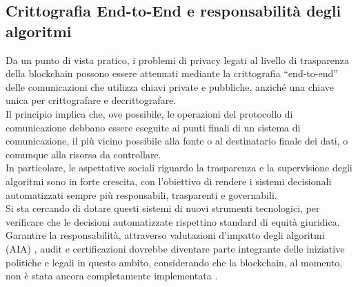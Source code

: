 \subsection{Crittografia End-to-End e responsabilità degli algoritmi}
Da un punto di vista pratico, i problemi di privacy legati al livello di trasparenza della blockchain possono essere attenuati mediante la crittografia “end-to-end” delle comunicazioni che utilizza chiavi private e pubbliche, anziché una chiave unica per crittografare e decrittografare.
\\Il principio implica che, ove possibile, le operazioni del protocollo di comunicazione debbano essere eseguite ai punti finali di un sistema di comunicazione, il più vicino possibile alla fonte o al destinatario finale dei dati, o comunque alla risorsa da controllare.
\\In particolare, le aspettative sociali riguardo la trasparenza e la supervisione degli algoritmi sono in forte crescita, con l’obiettivo di rendere i sistemi decisionali automatizzati sempre più responsabili, trasparenti e governabili. 
\\Si sta cercando di dotare questi sistemi di nuovi strumenti tecnologici, per verificare che le decisioni automatizzate rispettino standard di equità giuridica. 
\\Garantire la responsabilità, attraverso valutazioni d’impatto degli algoritmi (AIA) \cite{reisman_algorithmic_2018}, audit e certificazioni dovrebbe diventare parte integrante delle iniziative politiche e legali in questo ambito, considerando che la blockchain, al momento, non è stata ancora completamente implementata \cite{zhang_end_to_end_3}.

